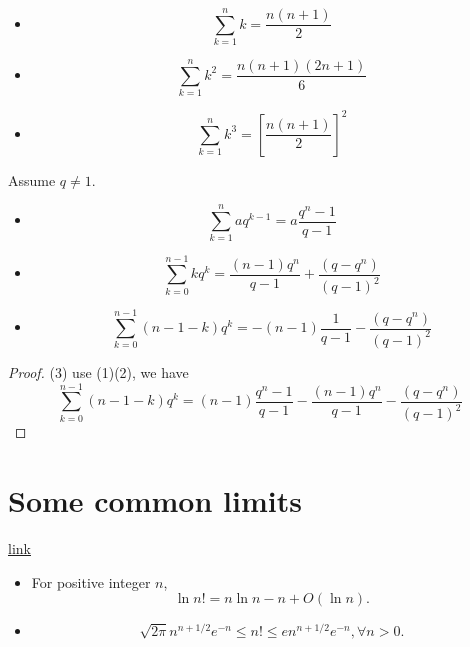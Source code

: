 \begin{refsection}
\begin{lemma}\cite[1]{gradshteyn2014table}\hfill
\begin{itemize}
	\item $$\sum_{k=1}^n k = \frac{n(n+1)}{2} $$
	\item $$\sum_{k=1}^n k^2 = \frac{n(n+1)(2n+1)}{6} $$
	\item $$\sum_{k=1}^n k^3 = [\frac{n(n+1)}{2}]^2 $$
	
\end{itemize}	
\end{lemma}


\begin{lemma}\cite[1]{gradshteyn2014table}\hfill
Assume $q\neq 1$.	
	\begin{itemize}
		\item $$\sum_{k=1}^n aq^{k-1} = a\frac{q^n-1}{q-1} $$
		\item $$\sum_{k=0}^{n-1} kq^{k} = \frac{(n-1)q^n}{q-1} + \frac{(q-q^n)}{(q-1)^2}$$
		\item $$\sum_{k=0}^{n-1} (n-1-k)q^{k} = -(n-1)\frac{1}{q-1}- \frac{(q-q^n)}{(q-1)^2}$$

	\end{itemize}	
\end{lemma}
\begin{proof}
(3) use (1)(2), we have
$$\sum_{k=0}^{n-1} (n-1-k)q^{k} = (n-1)\frac{q^n-1}{q-1}-\frac{(n-1)q^n}{q-1} - \frac{(q-q^n)}{(q-1)^2}$$

\end{proof}
\section{Some common limits}

\begin{lemma}
	\href{https://en.wikipedia.org/wiki/Stirling%27s_approximation}{link} \hfill
\begin{itemize}
	\item For positive integer $n$,	
	$$\ln n! = n\ln n - n + O(\ln n).$$
	\item 
	$$\sqrt{2\pi} n^{n+1/2}e^{-n} \leq n! \leq e n^{n+1/2}e^{-n}, \forall n > 0.$$
\end{itemize}	
\end{lemma}


\end{refsection}
